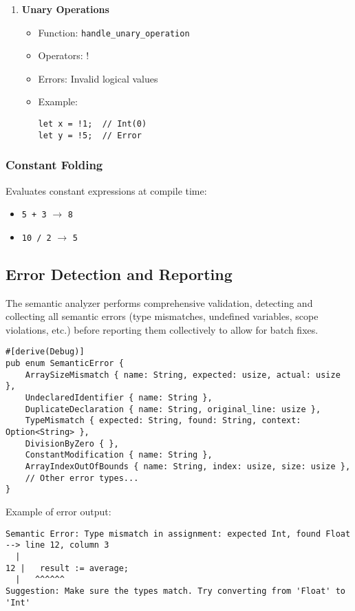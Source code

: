 \documentclass[12pt,a4paper]{article}
\begin{document}
\begin{enumerate}
    \item \textbf{Unary Operations}
    \begin{itemize}
        \item Function: \texttt{handle\_unary\_operation}
        \item Operators: !
        \item Errors: Invalid logical values
        \item Example:
        \begin{lstlisting}
let x = !1;  // Int(0)
let y = !5;  // Error
        \end{lstlisting}
    \end{itemize}
\end{enumerate}


\subsubsection*{Constant Folding}
Evaluates constant expressions at compile time:
\begin{itemize}
    \item \texttt{5 + 3} $\rightarrow$ \texttt{8}
    \item \texttt{10 / 2} $\rightarrow$ \texttt{5}
\end{itemize}


\subsection{Error Detection and Reporting}
The semantic analyzer performs comprehensive validation, detecting and collecting all semantic errors (type mismatches, undefined variables, scope violations, etc.) before reporting them collectively to allow for batch fixes.
\begin{lstlisting}[caption={Semantic Error Types}]
#[derive(Debug)]
pub enum SemanticError {
    ArraySizeMismatch { name: String, expected: usize, actual: usize },
    UndeclaredIdentifier { name: String },
    DuplicateDeclaration { name: String, original_line: usize },
    TypeMismatch { expected: String, found: String, context: Option<String> },
    DivisionByZero { },
    ConstantModification { name: String },
    ArrayIndexOutOfBounds { name: String, index: usize, size: usize },
    // Other error types...
}
\end{lstlisting}

Example of error output:

\begin{lstlisting}[caption={Semantic Error Output}]
Semantic Error: Type mismatch in assignment: expected Int, found Float
--> line 12, column 3
  |
12 |   result := average;
  |   ^^^^^^
Suggestion: Make sure the types match. Try converting from 'Float' to 'Int'
\end{lstlisting}
\end{document}
